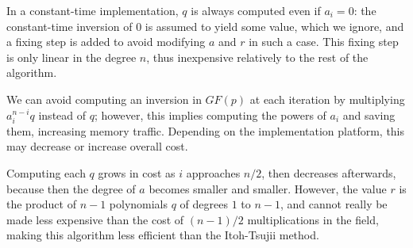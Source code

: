 \documentclass{llncs}
\newcommand{\GF}{GF}
\begin{document}
In a constant-time implementation, $q$ is always computed even if $a_i =
0$: the constant-time inversion of $0$ is assumed to yield some value,
which we ignore, and a fixing step is added to avoid modifying $a$ and
$r$ in such a case. This fixing step is only linear in the degree $n$,
thus inexpensive relatively to the rest of the algorithm.

We can avoid computing an inversion in $\GF(p)$ at each iteration by
multiplying $a_i^{n-i} q$ instead of $q$; however, this implies
computing the powers of $a_i$ and saving them, increasing memory
traffic. Depending on the implementation platform, this may decrease or
increase overall cost.

Computing each $q$ grows in cost as $i$ approaches $n/2$, then decreases
afterwards, because then the degree of $a$ becomes smaller and smaller.
However, the value $r$ is the product of $n-1$ polynomials $q$ of degrees
$1$ to $n-1$, and cannot really be made less expensive than the cost
of $(n-1)/2$ multiplications in the field, making this algorithm less
efficient than the Itoh-Tsujii method.
\end{document}
